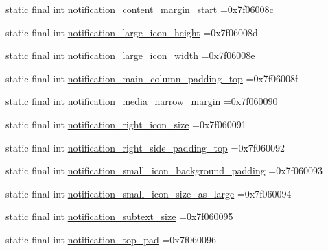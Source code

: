 \begin{DoxyCompactItemize}
\item 
static final int \mbox{\hyperlink{classcom_1_1example_1_1trainawearapplication_1_1_r_1_1dimen_a140835d2981ab5391ac41dcfcd31f3d6}{notification\+\_\+content\+\_\+margin\+\_\+start}} =0x7f06008c
\item 
static final int \mbox{\hyperlink{classcom_1_1example_1_1trainawearapplication_1_1_r_1_1dimen_ad47cb6722ef6f1fa5dc3af24f7957db4}{notification\+\_\+large\+\_\+icon\+\_\+height}} =0x7f06008d
\item 
static final int \mbox{\hyperlink{classcom_1_1example_1_1trainawearapplication_1_1_r_1_1dimen_ae0a36319876da53ba1b0b410c5dc16b5}{notification\+\_\+large\+\_\+icon\+\_\+width}} =0x7f06008e
\item 
static final int \mbox{\hyperlink{classcom_1_1example_1_1trainawearapplication_1_1_r_1_1dimen_a48c587a8a3423e5ebdcaa63c2f506af2}{notification\+\_\+main\+\_\+column\+\_\+padding\+\_\+top}} =0x7f06008f
\item 
static final int \mbox{\hyperlink{classcom_1_1example_1_1trainawearapplication_1_1_r_1_1dimen_aa8047f61b695d951d1aa2e722e790029}{notification\+\_\+media\+\_\+narrow\+\_\+margin}} =0x7f060090
\item 
static final int \mbox{\hyperlink{classcom_1_1example_1_1trainawearapplication_1_1_r_1_1dimen_ac44342eeb5862e655d4a407f641777d2}{notification\+\_\+right\+\_\+icon\+\_\+size}} =0x7f060091
\item 
static final int \mbox{\hyperlink{classcom_1_1example_1_1trainawearapplication_1_1_r_1_1dimen_a9d44728cbd36f68252e9fc4dea0e6f0c}{notification\+\_\+right\+\_\+side\+\_\+padding\+\_\+top}} =0x7f060092
\item 
static final int \mbox{\hyperlink{classcom_1_1example_1_1trainawearapplication_1_1_r_1_1dimen_a1fd9c09535d083689a5b53b630ec2826}{notification\+\_\+small\+\_\+icon\+\_\+background\+\_\+padding}} =0x7f060093
\item 
static final int \mbox{\hyperlink{classcom_1_1example_1_1trainawearapplication_1_1_r_1_1dimen_aaa78396149e997cc386aa62a56da8ad6}{notification\+\_\+small\+\_\+icon\+\_\+size\+\_\+as\+\_\+large}} =0x7f060094
\item 
static final int \mbox{\hyperlink{classcom_1_1example_1_1trainawearapplication_1_1_r_1_1dimen_a70692e530cd1ac77635443c7119ade26}{notification\+\_\+subtext\+\_\+size}} =0x7f060095
\item 
static final int \mbox{\hyperlink{classcom_1_1example_1_1trainawearapplication_1_1_r_1_1dimen_ae0090b1bafa072731756897af1387449}{notification\+\_\+top\+\_\+pad}} =0x7f060096

\end{DoxyCompactItemize}
